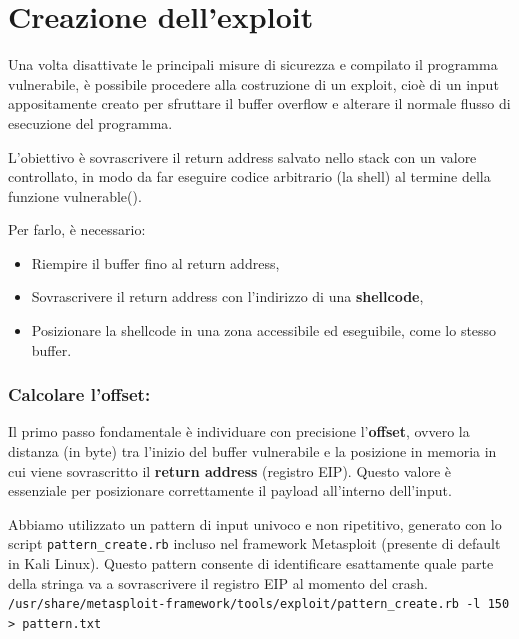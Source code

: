 \documentclass[main.tex]{subfiles}
\begin{document}
\section{Creazione dell'exploit}\label{sec:cap 3}

Una volta disattivate le principali misure di sicurezza e compilato il programma vulnerabile, è possibile procedere alla costruzione di un exploit, cioè di un input appositamente creato per sfruttare il buffer overflow e alterare il normale flusso di esecuzione del programma.

\noindent L’obiettivo è sovrascrivere il return address salvato nello stack con un valore controllato, in modo da far eseguire codice arbitrario (la shell) al termine della funzione vulnerable().

\noindent Per farlo, è necessario:

\begin{itemize}
    \item Riempire il buffer fino al return address,
    \item Sovrascrivere il return address con l’indirizzo di una \textbf{shellcode},
    \item Posizionare la shellcode in una zona accessibile ed eseguibile, come lo stesso buffer.
\end{itemize}

\subsubsection*{Calcolare l'offset:}

\noindent Il primo passo fondamentale è individuare con precisione l’\textbf{offset}, ovvero la distanza (in byte) tra l’inizio del buffer vulnerabile e la posizione in memoria in cui viene sovrascritto il \textbf{return address} (registro EIP). Questo valore è essenziale per posizionare correttamente il payload all’interno dell’input.


\noindent Abbiamo utilizzato un pattern di input univoco e non ripetitivo, generato con lo script \verb|pattern_create.rb| incluso nel framework Metasploit (presente di default in Kali Linux). Questo pattern consente di identificare esattamente quale parte della stringa va a sovrascrivere il registro EIP al momento del crash.\\

\noindent
\texttt{/usr/share/metasploit-framework/tools/exploit/pattern\_create.rb -l 150 > pattern.txt}\\
\end{document}
